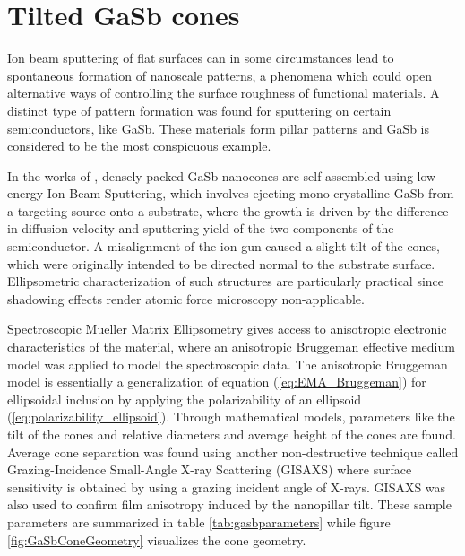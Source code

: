 \section{Tilted GaSb cones}
Ion beam sputtering of flat surfaces can in some circumstances lead to spontaneous formation of nanoscale patterns, a phenomena which could open alternative ways of controlling the surface roughness of functional materials\cite{Nerbo_insituFormationGasb}. A distinct type of pattern formation was found for sputtering on certain semiconductors, like GaSb. These materials form pillar patterns and GaSb is considered to be the most conspicuous example\cite{Nerbo_insituFormationGasb}.

In the works of \cite{gasbcones}, densely packed GaSb nanocones are self-assembled using low energy Ion Beam Sputtering, which involves ejecting mono-crystalline GaSb from a targeting source onto a substrate, where the growth is driven by the difference in diffusion velocity and sputtering yield of the two components of the semiconductor. A misalignment of the ion gun caused a slight tilt of the cones, which were originally intended to be directed normal to the substrate surface\cite{gasbcones}. Ellipsometric characterization of such structures are particularly practical since shadowing effects render atomic force microscopy non-applicable\cite{Nerbo_inclinedGasb}.

Spectroscopic Mueller Matrix Ellipsometry gives access to anisotropic electronic characteristics of the material, where an anisotropic Bruggeman effective medium model was applied to model the spectroscopic data. The anisotropic Bruggeman model is essentially a generalization of equation (\ref{eq:EMA_Bruggeman}) for ellipsoidal inclusion by applying the polarizability of an ellipsoid (\ref{eq:polarizability_ellipsoid}). Through mathematical models, parameters like the tilt of the cones and relative diameters and average height of the cones are found\cite{gasbcones}. Average cone separation was found using another non-destructive technique called Grazing-Incidence Small-Angle X-ray Scattering (GISAXS) where surface sensitivity is obtained by using a grazing incident angle of X-rays. GISAXS was also used to confirm film anisotropy induced by the nanopillar tilt\cite{gasbcones}. These sample parameters are summarized in table \ref{tab:gasbparameters} while figure \ref{fig:GaSbConeGeometry} visualizes the cone geometry.

